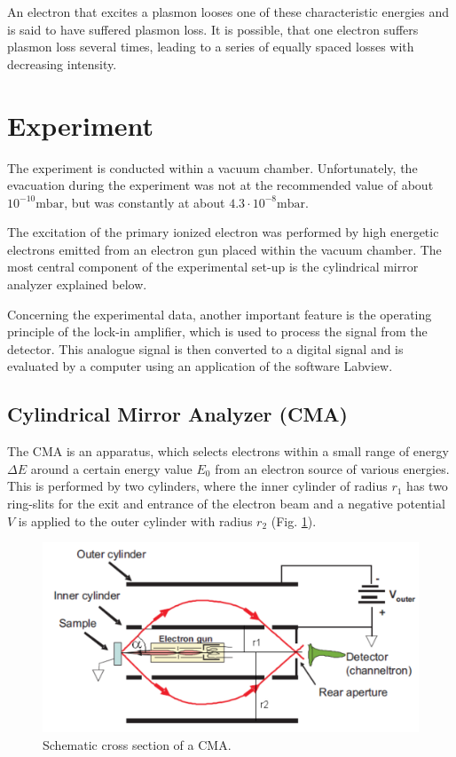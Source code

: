 \documentclass[a4paper]{scrartcl}
\numberwithin{equation}{section}
\numberwithin{figure}{section}
\numberwithin{table}{section}
\begin{document}
An electron that excites a plasmon looses one of these characteristic energies and is said to have suffered plasmon loss. It is possible, that one electron suffers plasmon loss several times, leading to a series of equally spaced losses with decreasing intensity.


\section{Experiment}
The experiment is conducted within a vacuum chamber. Unfortunately, the evacuation during the experiment was not at the recommended value of about $10^{-10} \text{mbar}$, but was constantly at about $4.3 \cdot 10^{-8}\text{mbar}$. 

The excitation of the primary ionized electron was performed by high energetic electrons emitted from an electron gun placed within the vacuum chamber. The most central component of the experimental set-up is the cylindrical mirror analyzer explained below. 

Concerning the experimental data, another important feature is the operating principle of the lock-in amplifier, which is used to process the signal from the detector. This analogue signal is then converted to a digital signal and is evaluated by a computer using an application of the software Labview.
\subsection{Cylindrical Mirror Analyzer (CMA)}
The CMA is an apparatus, which selects electrons within a small range of energy $\Delta E$ around a certain energy value $E_0$ from an electron source of various energies. This is performed by two cylinders, where the inner cylinder of radius $r_1$ has two ring-slits for the exit and entrance of the electron beam and a negative potential $V$ is applied to the outer cylinder with radius $r_2$ (Fig. \ref{cma}). 

\begin{figure}[htbp]
\centering
\includegraphics[width=0.6 \textwidth]{cma.pdf}
\caption{\small Schematic cross section of a CMA. \cite{skript}}
\label{cma}
\end{figure}
\end{document}
